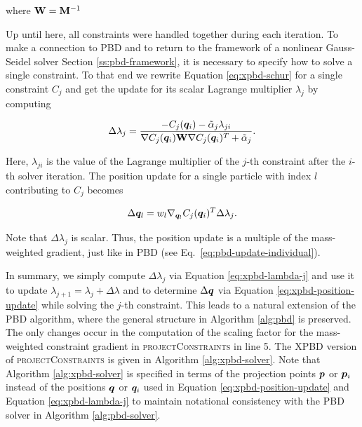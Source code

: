 \noindent where $\mathbf{W} = \mathbf{M}^{-1}$

Up until here, all constraints were handled together during each iteration. To make a connection to PBD and to return to the framework of a
nonlinear Gauss-Seidel solver Section \ref{ss:pbd-framework}, it is necessary to specify how to solve a single constraint. To that end we rewrite 
Equation \ref{eq:xpbd-schur} for a single constraint $C_j$ and get the update for its scalar Lagrange multiplier $\lambda_j$ by computing

\begin{equation}\label{eq:xpbd-lambda-j}
    \Delta \lambda_j = \frac{-C_j(\bm{q}_i) - \tilde{\alpha}_j \lambda_{ji}}{\nabla C_j(\bm{q}_i) \mathbf{W} \nabla C_j(\bm{q}_i)^T + \tilde{\alpha}_j}.
\end{equation}

\noindent Here, $\lambda_{ji}$ is the value of the Lagrange multiplier of the $j$-th constraint after the $i$-th solver iteration. The position update for 
a single particle with index $l$ contributing to $C_j$ becomes

\begin{equation}\label{eq:xpbd-position-update-i}
    \Delta \bm{q}_l = w_l \nabla_{\bm{q}_l} C_j(\bm{q}_i)^T \Delta \lambda_j.
\end{equation}

\noindent Note that $\Delta \lambda_j$ is scalar. Thus, the position update is a multiple of the mass-weighted gradient, just like in PBD 
(see Eq.\ \ref{eq:pbd-update-individual}).

In summary, we simply compute $\Delta \lambda_j$ via Equation \ref{eq:xpbd-lambda-j} and use it to 
update $\lambda_{j+1} = \lambda_j + \Delta \lambda$ and to determine $\Delta \bm{q}$ via Equation \ref{eq:xpbd-position-update} while solving the $j$-th constraint. 
This leads to a natural extension of the PBD algorithm, where the general structure in Algorithm \ref{alg:pbd} is preserved. The only changes occur in the 
computation of the scaling factor for the 
mass-weighted constraint gradient in \textsc{projectConstraints} in line 5. The XPBD version of \textsc{projectConstraints} is given in 
Algorithm \ref{alg:xpbd-solver}. Note that Algorithm \ref{alg:xpbd-solver} is specified in terms of the projection points $\bm{p}$ or $\bm{p}_i$ instead of the 
positions $\bm{q}$ or $\bm{q}_i$ used in Equation \ref{eq:xpbd-position-update} and Equation \ref{eq:xpbd-lambda-j} to maintain notational consistency with the
PBD solver in Algorithm \ref{alg:pbd-solver}.

